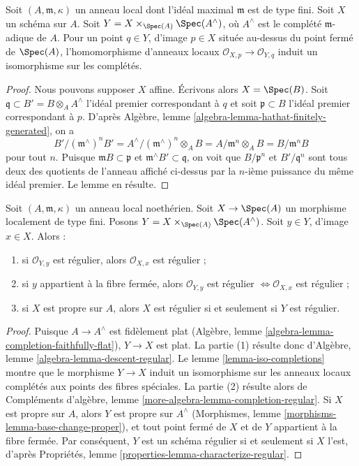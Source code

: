 \begin{lemma} \label{lemma-iso-completions} Soit $(A, \mathfrak m, \kappa)$ un anneau local dont l'idéal maximal $\mathfrak m$ est de type fini. Soit $X$ un schéma sur $A$. Soit $Y = X \times_{\Spec(A)} \Spec(A^\wedge)$, où $A^\wedge$ est le complété $\mathfrak m$-adique de $A$. Pour un point $q \in Y$, d'image $p \in X$ située au-dessus du point fermé de $\Spec(A)$, l'homomorphisme d'anneaux locaux $\mathcal{O}_{X, p} \to \mathcal{O}_{Y, q}$ induit un isomorphisme sur les complétés. \end{lemma}

\begin{proof} Nous pouvons supposer $X$ affine. Écrivons alors $X = \Spec(B)$. Soit $\mathfrak q \subset B' = B \otimes_A A^\wedge$ l'idéal premier correspondant à $q$ et soit $\mathfrak p \subset B$ l'idéal premier correspondant à $p$. D'après Algèbre, lemme \ref{algebra-lemma-hathat-finitely-generated}, on a $$
B'/(\mathfrak m^\wedge)^n B' =
A^\wedge/(\mathfrak m^\wedge)^n \otimes_A B =
A/\mathfrak m^n \otimes_A B = B/\mathfrak m^n B
$$ pour tout $n$. Puisque $\mathfrak m B \subset \mathfrak p$ et $\mathfrak m^\wedge B' \subset \mathfrak q$, on voit que $B/\mathfrak p^n$ et $B'/\mathfrak q^n$ sont tous deux des quotients de l'anneau affiché ci-dessus par la $n$-ième puissance du même idéal premier. Le lemme en résulte. \end{proof}

\begin{lemma} \label{lemma-port-regularity-to-completion} Soit $(A, \mathfrak m, \kappa)$ un anneau local noethérien. Soit $X \to \Spec(A)$ un morphisme localement de type fini. Posons $Y = X \times_{\Spec(A)} \Spec(A^\wedge)$. Soit $y \in Y$, d'image $x \in X$. Alors : \begin{enumerate} \item si $\mathcal{O}_{Y, y}$ est régulier, alors $\mathcal{O}_{X, x}$ est régulier ; \item si $y$ appartient à la fibre fermée, alors $\mathcal{O}_{Y, y}$ est régulier $\Leftrightarrow \mathcal{O}_{X, x}$ est régulier ; \item si $X$ est propre sur $A$, alors $X$ est régulier si et seulement si $Y$ est régulier. \end{enumerate} \end{lemma}

\begin{proof} Puisque $A \to A^\wedge$ est fidèlement plat (Algèbre, lemme \ref{algebra-lemma-completion-faithfully-flat}), $Y \to X$ est plat. La partie (1) résulte donc d'Algèbre, lemme \ref{algebra-lemma-descent-regular}. Le lemme \ref{lemma-iso-completions} montre que le morphisme $Y \to X$ induit un isomorphisme sur les anneaux locaux complétés aux points des fibres spéciales. La partie (2) résulte alors de Compléments d'algèbre, lemme \ref{more-algebra-lemma-completion-regular}. Si $X$ est propre sur $A$, alors $Y$ est propre sur $A^\wedge$ (Morphismes, lemme \ref{morphisms-lemma-base-change-proper}), et tout point fermé de $X$ et de $Y$ appartient à la fibre fermée. Par conséquent, $Y$ est un schéma régulier si et seulement si $X$ l'est, d'après Propriétés, lemme \ref{properties-lemma-characterize-regular}. \end{proof}

